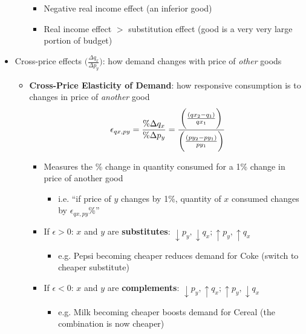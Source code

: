 \documentclass{article}
\begin{document}
\begin{itemize}
\begin{itemize}
		\begin{itemize}
			\item Negative real income effect (an inferior good)
			\item Real income effect $>$ substitution effect (good is a very very large portion of budget)
		\end{itemize} 
	\end{itemize}
	\item Cross-price effects $\bigg(\displaystyle \frac{\Delta q_x}{\Delta p_y} \bigg)$: how demand changes with price of \emph{other} goods
	\begin{itemize}
		\item \textbf{Cross-Price Elasticity of Demand}: how responsive consumption is to changes in price of \emph{another} good 
		\begin{equation*}
		\epsilon_{qx,py}=\frac{\% \Delta q_x}{\% \Delta p_y}=\cfrac{\bigg(\frac{(qx_2-q_1)}{qx_1}\bigg)}{\bigg(\frac{(py_2-py_1)}{py_1}\bigg)}
		\end{equation*}
		\begin{itemize}
			\item Measures the \% change in quantity consumed for a 1\% change in price of another good
			\begin{itemize}
				\item i.e. ``if price of $y$ changes by 1\%, quantity of $x$ consumed changes by \emph{$\epsilon_{qx,py}$}\%''
			\end{itemize}
			\item If $\epsilon>0$: $x$ and $y$ are \textbf{substitutes}: $\downarrow p_y, \downarrow q_x; \uparrow p_y, \uparrow q_x$
			\begin{itemize}
				\item e.g. Pepsi becoming cheaper reduces demand for Coke (switch to cheaper substitute) 
			\end{itemize} 
			\item If $\epsilon<0$: $x$ and $y$ are \textbf{complements}: $\downarrow p_y, \uparrow q_x; \uparrow p_y, \downarrow q_x$
						\begin{itemize}
				\item e.g. Milk becoming cheaper boosts demand for Cereal (the combination is now cheaper) 
			\end{itemize} 
		\end{itemize}
	\end{itemize} 
\end{itemize}
\end{document}
